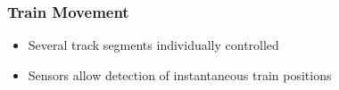 
\begin{frame}
  \frametitle{Train Movement}
\begin{itemize}
  \item Several track segments individually controlled 
  \pause
  \item Sensors allow detection of instantaneous train positions 
\end{itemize}
  \end{frame}

